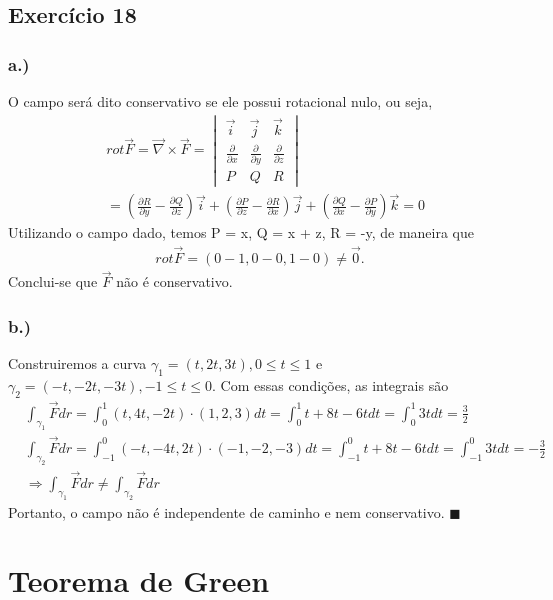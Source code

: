 \documentclass{article}
\renewcommand\qedsymbol{$\blacksquare$}
\begin{document}
\subsection{Exerc\'icio 18}  
\subsubsection*{a.)} O campo ser\'a dito conservativo se ele possui rotacional nulo, ou seja,
\begin{align*}
  &rot\vec{F} = \vec{\nabla} \times \vec{F} =   
  \begin{vmatrix}
    \vec{i} & \vec{j} & \vec{k} \\
    \frac{\partial{}}{\partial{x}} & \frac{\partial{}}{\partial{y}} & \frac{\partial{}}{\partial{z}} \\
    P & Q & R 
  \end{vmatrix} \\
  &= (\frac{\partial{R}}{\partial{y}} - \frac{\partial{Q}}{\partial{z}})\vec{i} + (\frac{\partial{P}}{\partial{z}} - \frac{\partial{R}}{\partial{x}})\vec{j} + (\frac{\partial{Q}}{\partial{x}} - \frac{\partial{P}}{\partial{y}})\vec{k} = 0
\end{align*} 
Utilizando o campo dado, temos P = x, Q = x + z, R = -y, de maneira que
 \begin{align*}
  rot\vec{F} = (0 - 1, 0 - 0, 1 - 0) \neq \vec{0}.
 \end{align*}
Conclui-se que $\vec{F}$ n\~ao \'e conservativo.

\subsubsection*{b.)}Construiremos a curva $\gamma_{1} = (t, 2t, 3t), 0\leq{t}\leq{1}$ e $\gamma_2=(-t, -2t, -3t), -1\leq{t}\leq{0}.$
Com essas condi\c c\~oes, as integrais s\~ao
 \begin{align*}
  &\int_{\gamma_1}^{}\vec{F}dr = \int_{0}^{1}(t, 4t, -2t)\cdot(1, 2, 3)dt = \int_{0}^{1}t+8t-6tdt = \int_{0}^{1}3tdt = \frac{3}{2} \\
  &\int_{\gamma_{2}}^{}\vec{F}dr = \int_{-1}^{0}(-t, -4t, 2t)\cdot(-1, -2, -3)dt = \int_{-1}^{0}t + 8t -6tdt = \int_{-1}^{0}3tdt = -\frac{3}{2}\\
  &\Rightarrow \int_{\gamma_1}^{}\vec{F}dr \neq \int_{\gamma_{2}}^{}\vec{F}dr
 \end{align*}  
Portanto, o campo n\~ao \'e independente de caminho e nem conservativo. \qedsymbol

\section*{Teorema de Green}
\end{document}
